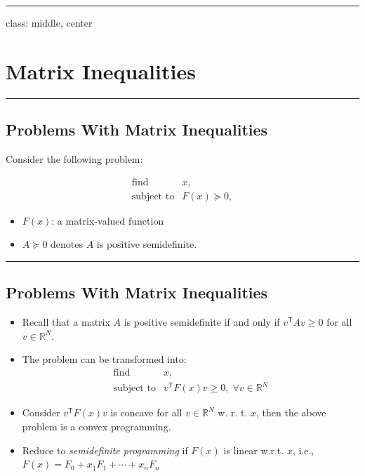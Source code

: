 \documentclass[
]{article}
\providecommand{\tightlist}{%
  \setlength{\itemsep}{0pt}\setlength{\parskip}{0pt}}
\begin{document}
\begin{center}\rule{0.5\linewidth}{0.5pt}\end{center}

class: middle, center

\section{Matrix Inequalities}\label{matrix-inequalities}

\begin{center}\rule{0.5\linewidth}{0.5pt}\end{center}

\subsection{Problems With Matrix
Inequalities}\label{problems-with-matrix-inequalities}

Consider the following problem:

\[\begin{array}{ll}
    \text{find}    & x, \\
    \text{subject to}  & F(x) \succeq 0,
\end{array}\]

\begin{itemize}
\tightlist
\item
  \(F(x)\): a matrix-valued function
\item
  \(A \succeq 0\) denotes \(A\) is positive semidefinite.
\end{itemize}

\begin{center}\rule{0.5\linewidth}{0.5pt}\end{center}

\subsection{Problems With Matrix
Inequalities}\label{problems-with-matrix-inequalities-1}

\begin{itemize}
\tightlist
\item
  Recall that a matrix \(A\) is positive semidefinite if and only if
  \(v^\mathsf{T} A v \ge 0\) for all \(v \in \mathbb{R}^N\).
\item
  The problem can be transformed into: \[\begin{array}{ll}
            \text{find}      & x, \\
            \text{subject to}    & v^\mathsf{T} F(x) v \ge 0, \; \forall v \in \mathbb{R}^N
    \end{array}\]
\item
  Consider \(v^\mathsf{T} F(x) v\) is concave for all
  \(v \in \mathbb{R}^N\) w. r. t. \(x\), then the above problem is a
  convex programming.
\item
  Reduce to \emph{semidefinite programming} if \(F(x)\) is linear w.r.t.
  \(x\), i.e., \(F(x) = F_0 + x_1 F_1 + \cdots + x_n F_n\)
\end{itemize}
\end{document}
